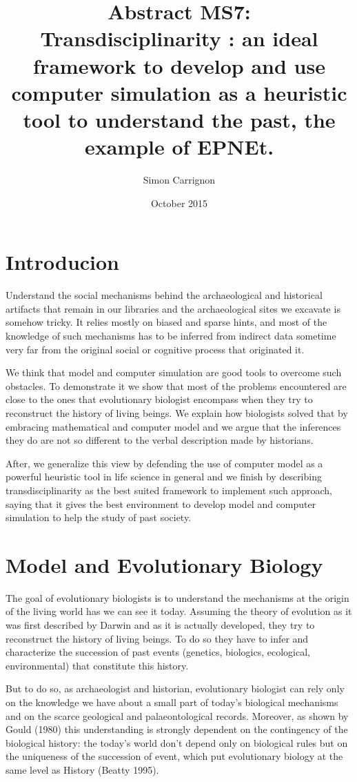 \documentclass[a4paper]{article}
\title{Abstract MS7:\\ Transdisciplinarity : an ideal framework to develop and use computer simulation as a heuristic tool to understand the past, the example of EPNEt.}
\author{Simon Carrignon}
\date{October 2015}
\begin{document}
\maketitle 


\section{Introducion}
Understand the social mechanisms behind the archaeological and historical artifacts that remain in our libraries and the archaeological sites we excavate is somehow tricky. It relies mostly on biased and sparse hints, and most of the knowledge of such mechanisms has to be inferred from indirect data sometime very far from the original social or cognitive process that originated it.

We think that model and computer simulation are good tools to overcome such obstacles. To demonstrate it we show that most of the problems encountered are close to the ones that evolutionary biologist encompass when they try to reconstruct the history of living beings. We explain how biologists solved that by embracing mathematical and computer model and we argue that the inferences they do are not so different to the verbal description made by historians.

After, we  generalize this view by defending the use of computer model as a powerful heuristic tool in life science in general and we finish by describing transdisciplinarity as the best suited framework to implement such approach, saying that it gives the best environment to develop model and computer simulation to help the study of past society.

\section{Model and Evolutionary Biology }
The goal of evolutionary biologists is to understand the mechanisms at the origin of the living world has we can see it today. Assuming the theory of evolution as it was first described by Darwin and as it is actually developed, they try to reconstruct the history of living beings. To do so they have to infer and characterize the succession of past events (genetics, biologics, ecological, environmental) that constitute this history. 

But to do so, as archaeologist and historian, evolutionary biologist can rely only on the knowledge we have about a small part of today's biological mechanisms and on the scarce geological and palaeontological records.  Moreover, as shown by Gould (1980) this understanding is strongly dependent on the contingency of the biological history: the today's world don't depend only on biological rules but on the uniqueness of the succession of event, which put evolutionary biology at the same level as History (Beatty 1995).  
\end{document}
